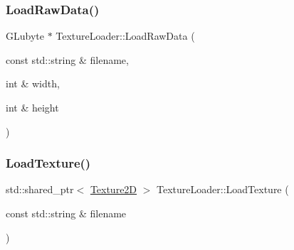 \hypertarget{namespace_texture_loader_a1dd0802d2fc0d1169aa6899334ee5d0d}{}\label{namespace_texture_loader_a1dd0802d2fc0d1169aa6899334ee5d0d} 
\subsubsection{\texorpdfstring{Load\+Raw\+Data()}{LoadRawData()}}
{\footnotesize\ttfamily G\+Lubyte $\ast$ Texture\+Loader\+::\+Load\+Raw\+Data (\begin{DoxyParamCaption}\item[{const std\+::string \&}]{filename,  }\item[{int \&}]{width,  }\item[{int \&}]{height }\end{DoxyParamCaption})}

\hypertarget{namespace_texture_loader_aed2af32d44d07368f1f426c4274418c0}{}\label{namespace_texture_loader_aed2af32d44d07368f1f426c4274418c0} 
\subsubsection{\texorpdfstring{Load\+Texture()}{LoadTexture()}}
{\footnotesize\ttfamily std\+::shared\+\_\+ptr$<$ \hyperlink{class_texture2_d}{Texture2D} $>$ Texture\+Loader\+::\+Load\+Texture (\begin{DoxyParamCaption}\item[{const std\+::string \&}]{filename }\end{DoxyParamCaption})}

